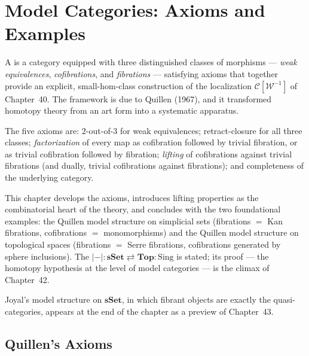 
\chapter{Model Categories: Axioms and Examples}

\begin{overviewbox}
A  is a category equipped with three distinguished
classes of morphisms — \emph{weak equivalences}, \emph{cofibrations}, and
\emph{fibrations} — satisfying axioms that together provide an explicit,
small-hom-class construction of the localization
$\mathcal{C}[\mathcal{W}^{-1}]$ of Chapter~40. The framework is due to
Quillen (1967), and it transformed homotopy theory from an art form into
a systematic apparatus.

The five axioms are: $2$-out-of-$3$ for weak equivalences; retract-closure
for all three classes; \emph{factorization} of every map as cofibration
followed by trivial fibration, or as trivial cofibration followed by
fibration; \emph{lifting} of cofibrations against trivial fibrations
(and dually, trivial cofibrations against fibrations); and completeness
of the underlying category.

This chapter develops the axioms, introduces lifting properties as the
combinatorial heart of the theory, and concludes with the two
foundational examples: the Quillen model structure on simplicial sets
(fibrations $=$ Kan fibrations, cofibrations $=$ monomorphisms) and the
Quillen model structure on topological spaces (fibrations $=$ Serre
fibrations, cofibrations generated by sphere inclusions). The
 $\lvert{-}\rvert : \mathbf{sSet} \rightleftarrows
\mathbf{Top} : \mathrm{Sing}$ is stated; its proof — the homotopy
hypothesis at the level of model categories — is the climax of Chapter~42.

Joyal's model structure on $\mathbf{sSet}$, in which fibrant objects are
exactly the quasi-categories, appears at the end of the chapter as a
preview of Chapter~43.
\end{overviewbox}


\section{Quillen's Axioms}
\label{sec:quillen-axioms}

